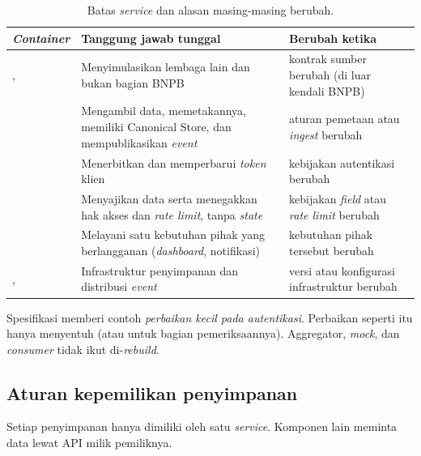 \begin{table}[H]
\centering\small
\begin{tabularx}{\textwidth}{@{}L{3.8cm}L{4.4cm}Y@{}}
\toprule
\textbf{\emph{Container}} & \textbf{Tanggung jawab tunggal} & \textbf{Berubah ketika}\\
\midrule
{},  & Menyimulasikan lembaga lain dan bukan bagian BNPB & kontrak sumber berubah (di luar kendali BNPB)\\
 & Mengambil data, memetakannya, memiliki Canonical Store, dan mempublikasikan \emph{event} & aturan pemetaan atau \emph{ingest} berubah\\
 & Menerbitkan dan memperbarui \emph{token} klien & kebijakan autentikasi berubah\\
 & Menyajikan data serta menegakkan hak akses dan \emph{rate limit}, tanpa \emph{state} & kebijakan \emph{field} atau \emph{rate limit} berubah\\
 & Melayani satu kebutuhan pihak yang berlangganan (\emph{dashboard}, notifikasi) & kebutuhan pihak tersebut berubah\\
,  & Infrastruktur penyimpanan dan distribusi \emph{event} & versi atau konfigurasi infrastruktur berubah\\
\bottomrule
\end{tabularx}
\caption{Batas \emph{service} dan alasan masing-masing berubah.}
\end{table}

Spesifikasi memberi contoh \emph{perbaikan kecil pada autentikasi}. Perbaikan seperti itu hanya menyentuh
 (atau  untuk bagian pemeriksaannya). Aggregator, \emph{mock}, dan \emph{consumer} tidak ikut
di-\emph{rebuild}.

\subsection{Aturan kepemilikan penyimpanan}

Setiap penyimpanan hanya dimiliki oleh satu \emph{service}. Komponen lain meminta data lewat API milik pemiliknya.

